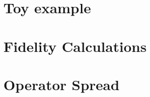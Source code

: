 \documentclass[11pt, oneside, listof=totoc]{scrbook}
\begin{document}
\section{Toy example}







\section{Fidelity Calculations}



\section{Operator Spread}

\backmatter\printbibliography[heading=bibintoc, title=Bibliography]
\end{document}
